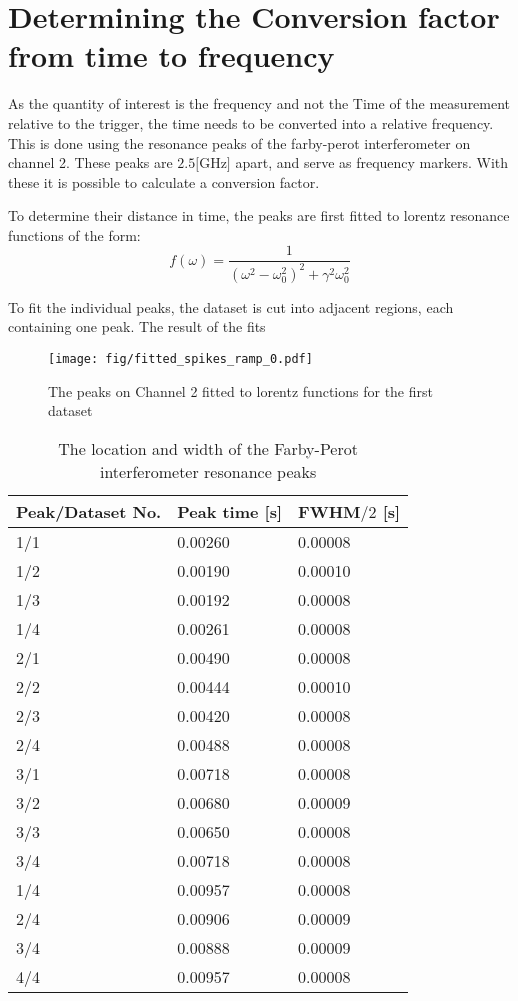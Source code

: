 \section{Determining the Conversion factor from time to frequency}
As the quantity of interest is the frequency and not the Time of the measurement relative to the trigger, the time needs to be converted into a
relative frequency. This is done using the resonance peaks of the farby-perot interferometer on channel 2. These peaks are $2.5 \text{[GHz]}$ apart,
and serve as frequency markers. With these it is possible to calculate a conversion factor.

To determine their distance in time, the peaks are first fitted to lorentz resonance functions of the form:
$$ f(\omega) = \frac{1}{(\omega^2-\omega_0^2)^2 + \gamma^2\omega_0^2}$$

To fit the individual peaks, the dataset is cut into adjacent regions, each containing one peak. The result of the fits 

\begin{figure}[tb]
	\texttt{[image: fig/fitted\_spikes\_ramp\_0.pdf]}
	\caption{The peaks on Channel 2 fitted to lorentz functions for the first dataset}
	\label{fig:data_overview_small}
\end{figure}

\begin{table}
	\begin{center}
		\label{tab:freq_peaks}
		\begin{tabular}{|m{10em} m{10em} m{10em}|}
			\hline
			\textbf{Peak/Dataset No.} & Peak time [s] & $\textbf{FWHM}/2$ [s] \\
			\hline\hline
			1/1 & 0.00260 & 0.00008 \\
			1/2 & 0.00190 & 0.00010 \\
			1/3 & 0.00192 & 0.00008 \\
			1/4 & 0.00261 & 0.00008 \\
			\hline
			2/1 & 0.00490 & 0.00008 \\
			2/2 & 0.00444 & 0.00010 \\
			2/3 & 0.00420 & 0.00008 \\
			2/4 & 0.00488 & 0.00008 \\
			\hline
			3/1 & 0.00718 & 0.00008 \\
			3/2 & 0.00680 & 0.00009 \\
			3/3 & 0.00650 & 0.00008 \\
			3/4 & 0.00718 & 0.00008 \\
			\hline
			1/4 & 0.00957 & 0.00008 \\
			2/4 & 0.00906 & 0.00009 \\
			3/4 & 0.00888 & 0.00009 \\
			4/4 & 0.00957 & 0.00008 \\
			\hline
		\end{tabular}
		\caption{The location and width of the Farby-Perot interferometer resonance peaks}
	\end{center}
\end{table}

